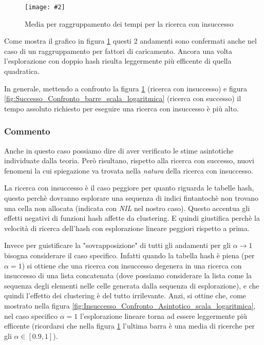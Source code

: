 \documentclass{article}
\newcommand{\image}[3][1]{
	\centering
	\texttt{[image: \#2]}
	\caption{#3}
}
\begin{document}
\begin{figure}[H]
\image[0.75]{Insuccesso_Confronto_barre_scala_logaritmica}{Media per raggruppamento dei tempi per la ricerca con insuccesso}
\label{fig:Insuccesso_Confronto_barre_scala_logaritmica}
\end{figure}

Come mostra il grafico in figura \ref{fig:Insuccesso_Confronto_barre_scala_logaritmica} questi 2 andamenti sono confermati anche nel caso di un raggruppamento per fattori di caricamento. Ancora una volta l'esplorazione con doppio hash risulta leggermente più efficente di quella quadratica.

In generale, mettendo a confronto la figura \ref{fig:Insuccesso_Confronto_barre_scala_logaritmica} (ricerca con insuccesso) e figura \ref{fig:Successo_Confronto_barre_scala_logaritmica} (ricerca con successo) il tempo assoluto richiesto per eseguire una ricerca con insuccesso è più alto.

\subsubsection{Commento}
Anche in questo caso possiamo dire di aver verificato le stime asintotiche individuate dalla teoria. Però risultano, rispetto alla ricerca con successo, nuovi fenomeni la cui spiegazione va trovata nella \emph{natura} della ricerca con insuccesso.

La ricerca con insuccesso è il caso peggiore per quanto riguarda le tabelle hash, questo perchè dovranno esplorare una sequenza di indici fintantochè non trovano una cella non allocata (indicata con \emph{NIL} nel nostro caso). Questo accentua gli effetti negativi di funzioni hash affette da clustering. E quindi giustifica perchè la velocità di ricerca dell'hash con esplorazione lineare peggiori rispetto a prima.

Invece per guistificare la "sovrapposizione" di tutti gli andamenti per gli $\alpha \longrightarrow 1$ bisogna considerare il caso specifico. Infatti quando la tabella hash è piena (per $\alpha = 1$) si ottiene che una ricerca con insuccesso degenera in una ricerca con insuccesso di una lista concatenata (dove possiamo considerare la lista come la sequenza degli elementi nelle celle generata dalla sequenza di esplorazione), e che quindi l'effetto dei clustering è del tutto irrilevante. Anzi, si ottine che, come mostrato nella figura \ref{fig:Insuccesso_Confronto_Asintotico_scala_logaritmica}, nel caso specifico $\alpha = 1$ l'esplorazione lineare torna ad essere leggermente più efficente (ricordarsi che nella figura \ref{fig:Insuccesso_Confronto_barre_scala_logaritmica} l'ultima barra è una media di ricerche per gli $\alpha \in [0.9, 1]$).
\end{document}
